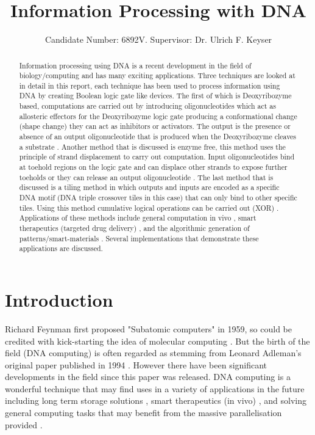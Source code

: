 \documentclass[11pt,a4paper,portrait]{article}
\title{Information Processing with DNA}
\author{Candidate Number: 6892V. Supervisor: Dr. Ulrich F. Keyser}
\begin{document}
\begin{titlingpage}
\maketitle
	
\begin{abstract}
Information processing using DNA is a recent development in the field of biology/computing and has many exciting applications. Three techniques are looked at in detail in this report, each technique has been used to process information using DNA by creating Boolean logic gate like devices. The first of which is Deoxyribozyme based, computations are carried out by introducing oligonucleotides which act as allosteric effectors for the Deoxyribozyme logic gate producing a conformational change (shape change) they can act as inhibitors or activators. The output is the presence or absence of an output oligonucleotide that is produced when the Deoxyribozyme cleaves a substrate \cite{DeoxyribozymeLogic}. Another method that is discussed is enzyme free, this method uses the principle of strand displacement to carry out computation. Input oligonucleotides bind at toehold regions on the logic gate and can displace other strands to expose further toeholds or they can release an output oligonucleotide \cite{enzymefree}. The last method that is discussed is a tiling method in which outputs and inputs are encoded as a specific DNA motif (DNA triple crossover tiles in this case) that can only bind to other specific tiles. Using this method cumulative logical operations can be carried out (XOR) \cite{Tiles00}. Applications of these methods include general computation in vivo \cite{Qian11}, smart therapeutics (targeted drug delivery) \cite{Aptamer}, and the algorithmic generation of patterns/smart-materials\cite{Tiles00} \cite{Sierpinski}. Several implementations that demonstrate these applications are discussed.
\end{abstract}
	
\end{titlingpage}

\clearpage
\section{Introduction}

Richard Feynman first proposed "Subatomic computers" in 1959, so could be credited with kick-starting the idea of molecular computing \cite{Feynmann}. But the birth of the field (DNA computing) is often regarded as stemming from Leonard Adleman's original paper published in 1994 \cite{Adleman1994}. However there have been significant developments in the field since this paper was released. DNA computing is a wonderful technique that may find uses in a variety of applications in the future including long term storage solutions \cite{Cox2001}, smart therapeutics (in vivo) \cite{Qian11}, and solving general computing tasks that may benefit from the massive parallelisation provided \cite{Adleman1994}\cite{Ezziane06}.
\\ \\
\end{document}
